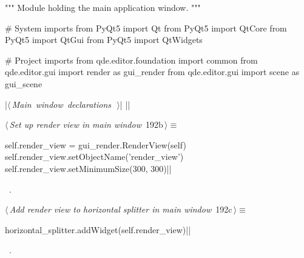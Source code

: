 \documentclass[%
    a4paper,    %
    justified,  %
    nobib,      %
    openany     %
]{tufte-book}
\makeatletter
\renewcommand{\label}[1]{\@tufte@label{##1}}%
\makeatother
\begin{document}
\begin{fullwidth}
\begin{flushleft}
\begin{minipage}{\linewidth}
\begin{pythoncode}
""" Module holding the main application window. """

# System imports
from PyQt5 import Qt
from PyQt5 import QtCore
from PyQt5 import QtGui
from PyQt5 import QtWidgets

# Project imports
from qde.editor.foundation import common
from qde.editor.gui import render as gui_render
from qde.editor.gui import scene as gui_scene


|\hbox{$\langle\,${\itshape Main window declarations}\nobreak\ {\footnotesize {}}$\,\rangle$}|
|\NWsep|
\end{pythoncode}
\vspace{1.5ex}
\footnotesize
\begin{list}{}{\setlength{\itemsep}{-\parsep}\setlength{\itemindent}{-\leftmargin}}

\item{}
\end{list}
\end{minipage}\vspace{4ex}
\end{flushleft}
\begin{flushleft} \small
\begin{minipage}{\linewidth}\label{scrap176}\raggedright\small
{} $\langle\,${\itshape Set up render view in main window}\nobreak\ {\footnotesize {192b}}$\,\rangle\equiv$
\vspace{-1ex}
\begin{pythoncode}
self.render_view = gui_render.RenderView(self)
self.render_view.setObjectName('render_view')
self.render_view.setMinimumSize(300, 300)|\NWsep|
\end{pythoncode}
\vspace{1.5ex}
\footnotesize
\begin{list}{}{\setlength{\itemsep}{-\parsep}\setlength{\itemindent}{-\leftmargin}}
\item \NWtxtMacroRefIn\ .

\item{}
\end{list}
\end{minipage}\vspace{4ex}
\end{flushleft}
\begin{flushleft} \small
\begin{minipage}{\linewidth}\label{scrap177}\raggedright\small
{} $\langle\,${\itshape Add render view to horizontal splitter in main window}\nobreak\ {\footnotesize {192c}}$\,\rangle\equiv$
\vspace{-1ex}
\begin{pythoncode}
horizontal_splitter.addWidget(self.render_view)|\NWsep|
\end{pythoncode}
\vspace{1.5ex}
\footnotesize
\begin{list}{}{\setlength{\itemsep}{-\parsep}\setlength{\itemindent}{-\leftmargin}}
\item \NWtxtMacroRefIn\ .


\end{list}
\end{minipage}
\end{flushleft}
\end{fullwidth}
\end{document}
